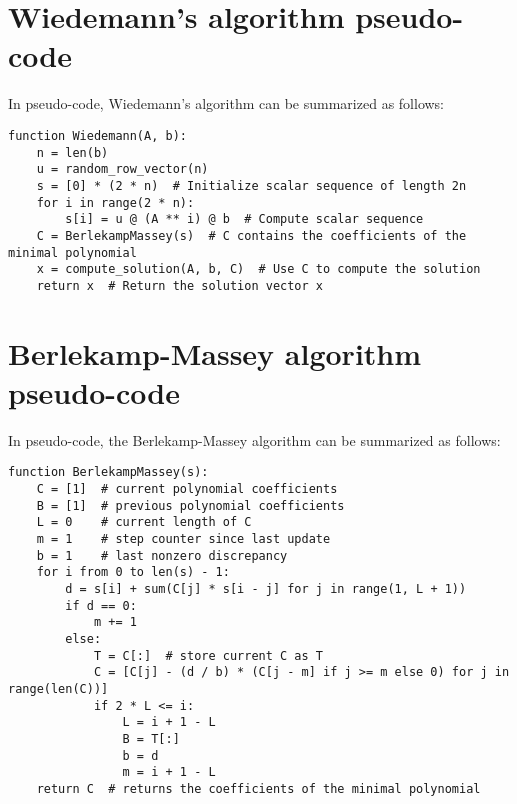 \documentclass[a4paper, 11pt]{article}
\begin{document}
\newpage

\appendix

\section{Wiedemann's algorithm pseudo-code}
In pseudo-code, Wiedemann's algorithm can be summarized as follows:
\begin{verbatim}
function Wiedemann(A, b):
    n = len(b)
    u = random_row_vector(n)
    s = [0] * (2 * n)  # Initialize scalar sequence of length 2n
    for i in range(2 * n):
        s[i] = u @ (A ** i) @ b  # Compute scalar sequence
    C = BerlekampMassey(s)  # C contains the coefficients of the minimal polynomial
    x = compute_solution(A, b, C)  # Use C to compute the solution
    return x  # Return the solution vector x
\end{verbatim}

\section{Berlekamp-Massey algorithm pseudo-code}
In pseudo-code, the Berlekamp-Massey algorithm can be summarized as follows:
\begin{verbatim}
function BerlekampMassey(s):
    C = [1]  # current polynomial coefficients
    B = [1]  # previous polynomial coefficients
    L = 0    # current length of C
    m = 1    # step counter since last update
    b = 1    # last nonzero discrepancy
    for i from 0 to len(s) - 1:
        d = s[i] + sum(C[j] * s[i - j] for j in range(1, L + 1))
        if d == 0:
            m += 1
        else:
            T = C[:]  # store current C as T
            C = [C[j] - (d / b) * (C[j - m] if j >= m else 0) for j in range(len(C))]
            if 2 * L <= i:
                L = i + 1 - L
                B = T[:]
                b = d
                m = i + 1 - L
    return C  # returns the coefficients of the minimal polynomial
\end{verbatim}



\end{document}
